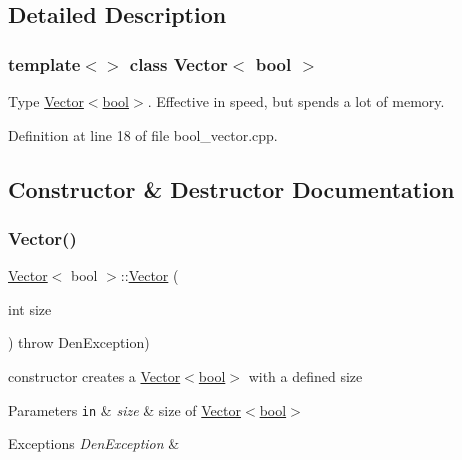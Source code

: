 \subsection{Detailed Description}
\subsubsection*{template$<$$>$\newline
class Vector$<$ bool $>$}

Type \hyperlink{classVector_3_01bool_01_4}{Vector$<$bool$>$}. Effective in speed, but spends a lot of memory. 

Definition at line 18 of file bool\+\_\+vector.\+cpp.



\subsection{Constructor \& Destructor Documentation}
\mbox{\label{classVector_3_01bool_01_4_ad097ece2d95bca611f81522a6cd2f054}} 
\subsubsection{\texorpdfstring{Vector()}{Vector()}\hspace{0.1cm}{\footnotesize\ttfamily [1/5]}}
{\footnotesize\ttfamily \hyperlink{classVector}{Vector}$<$ bool $>$\+::\hyperlink{classVector}{Vector} (\begin{DoxyParamCaption}\item[{int}]{size }\end{DoxyParamCaption}) throw  Den\+Exception) }



constructor  creates a \hyperlink{classVector_3_01bool_01_4}{Vector$<$bool$>$} with a defined size 


\begin{DoxyParams}[1]{Parameters}
\mbox{\tt in}  & {\em size} & size of \hyperlink{classVector_3_01bool_01_4}{Vector$<$bool$>$} \\
\hline
\end{DoxyParams}

\begin{DoxyExceptions}{Exceptions}
{\em Den\+Exception} & \\
\hline
\end{DoxyExceptions}



